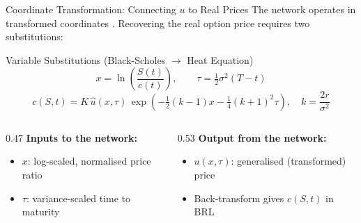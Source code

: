 \begin{frame}{Coordinate Transformation: Connecting $u$ to Real Prices}
  The network operates in transformed coordinates \cite{santos2024}. Recovering the real option price requires two substitutions:

  \vspace{0.3em}
  \begin{block}{Variable Substitutions (Black-Scholes $\to$ Heat Equation)}
    \vspace{-10pt}
    \[x = \ln\!\left(\frac{S(t)}{c(t)}\right), \qquad \tau = \tfrac{1}{2}\sigma^2 (T - t)\]
    \[c(S,t) = K\,\hat{u}(x,\tau)\,\exp\!\left(-\tfrac{1}{2}(k-1)x - \tfrac{1}{4}(k+1)^2\tau\right), \quad k = \frac{2r}{\sigma^2}\]
  \end{block}

  \vspace{0.3em}
  \begin{columns}[T]
    \begin{column}{0.47\textwidth}
      \textbf{Inputs to the network:}
      \begin{itemize}
        \item $x$: log-scaled, normalised price ratio
        \item $\tau$: variance-scaled time to maturity
      \end{itemize}
    \end{column}
    \begin{column}{0.53\textwidth}
      \textbf{Output from the network:}
      \begin{itemize}
        \item $u(x,\tau)$: generalised (transformed) price
        \item Back-transform gives $c(S,t)$ in BRL
      \end{itemize}
    \end{column}
  \end{columns}
\end{frame}